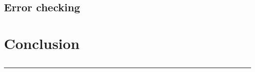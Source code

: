 \documentclass[10 pt, conference]{cssconf}
\begin{document}
\subsection{Error checking}
\lipsum[9]

\section{Conclusion}
\lipsum[10]

\clearpage
\newpage
\onecolumn

{}

\onecolumn
\renewcommand{\thefigure}{A\arabic{figure}}
\setcounter{figure}{0}
\begin{appendices}
\section{} 
\rule{0.975\textwidth}{.4pt}
\vspace{40pt}
\end{appendices}
\end{document}
